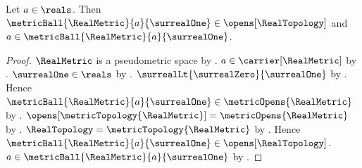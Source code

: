 \begin{theorem}\label{real_unit_ball_is_open_neighbourhood}
    Let $a\in\reals$.
    Then $\metricBall{\RealMetric}{a}{\surrealOne}
        \in\opens[\RealTopology]$ and
        $a\in\metricBall{\RealMetric}{a}{\surrealOne}$.
\end{theorem}
\begin{proof}
    $\RealMetric$ is a pseudometric space by
        .
    $a\in\carrier[\RealMetric]$ by
        .
    $\surrealOne\in\reals$ by .
    $\surrealLt{\surrealZero}{\surrealOne}$ by
        .
    Hence $\metricBall{\RealMetric}{a}{\surrealOne}
        \in\metricOpens{\RealMetric}$ by .
    $\opens[\metricTopology{\RealMetric}]=\metricOpens{\RealMetric}$
        by .
    $\RealTopology=\metricTopology{\RealMetric}$ by .
    Hence $\metricBall{\RealMetric}{a}{\surrealOne}
        \in\opens[\RealTopology]$.
    $a\in\metricBall{\RealMetric}{a}{\surrealOne}$ by
        .
\end{proof}
